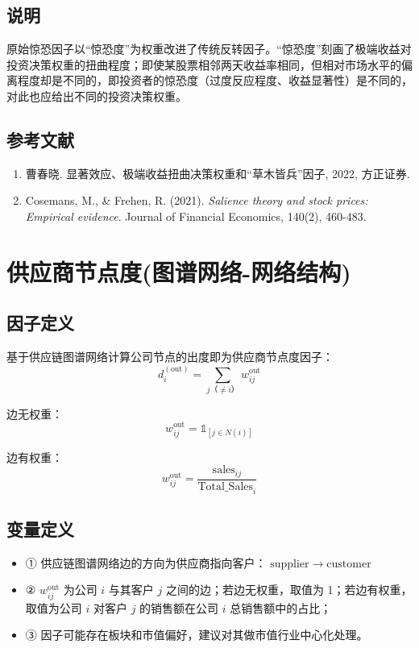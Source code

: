 \documentclass{article}
\begin{document}
\subsection{说明}
原始惊恐因子以“惊恐度”为权重改进了传统反转因子。“惊恐度”刻画了极端收益对投资决策权重的扭曲程度；即使某股票相邻两天收益率相同，但相对市场水平的偏离程度却是不同的，即投资者的惊恐度（过度反应程度、收益显著性）是不同的，对此也应给出不同的投资决策权重。

\subsection{参考文献}
\begin{enumerate}
    \item 曹春晓. 显著效应、极端收益扭曲决策权重和“草木皆兵”因子, 2022, 方正证券.
    \item Cosemans, M., \& Frehen, R. (2021). \textit{Salience theory and stock prices: Empirical evidence}. Journal of Financial Economics, 140(2), 460-483.
\end{enumerate}

\section{供应商节点度(图谱网络-网络结构)}

\subsection{因子定义}
基于供应链图谱网络计算公司节点的出度即为供应商节点度因子：
\begin{equation}
    d_i^{(\mathrm{out})} = \sum_{j （\neq i）} w_{ij}^{\mathrm{out}}
\end{equation}

边无权重：
\begin{equation}
    w_{ij}^{\mathrm{out}} = \mathbb{1}_{[j \in N(i)]}
\end{equation}

边有权重：
\begin{equation}
    w_{ij}^{\mathrm{out}} = \frac{\mathrm{sales}_{ij}}{\mathrm{Total\_Sales}_i}
\end{equation}

\subsection{变量定义}
\begin{itemize}
    \item ① 供应链图谱网络边的方向为供应商指向客户： \(\mathrm{supplier} \rightarrow \mathrm{customer}\)
    \item ② \( w_{ij}^{\mathrm{out}} \) 为公司 \( i \) 与其客户 \( j \) 之间的边；若边无权重，取值为 1；若边有权重，取值为公司 \( i \) 对客户 \( j \) 的销售额在公司 \( i \) 总销售额中的占比；
    \item ③ 因子可能存在板块和市值偏好，建议对其做市值行业中心化处理。
\end{itemize}
\end{document}
